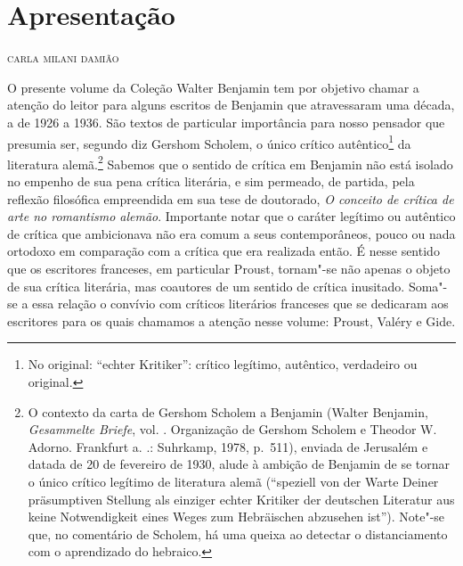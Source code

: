 \chapter*{Apresentação}

\begin{flushright}
{\bigskip\small\scshape\hfill {carla milani damião}}\smallskip
\end{flushright}

\noindent{}O presente volume da Coleção Walter Benjamin tem por objetivo chamar a
atenção do leitor para alguns escritos de Benjamin que atravessaram uma década, a de 1926 a 1936. São textos de particular importância para nosso pensador que
presumia ser, segundo diz Gershom Scholem, o único crítico autêntico\footnote{No original: ``echter Kritiker'': crítico legítimo, autêntico, verdadeiro ou original.} da
literatura alemã.\footnote{O contexto da carta de Gershom Scholem a
  Benjamin (Walter Benjamin, \emph{Gesammelte Briefe}, vol. . Organização de Gershom
  Scholem e Theodor W. Adorno. Frankfurt a. .: Suhrkamp, 1978, p.~511), enviada de Jerusalém e datada de 20 de fevereiro de 1930, alude à ambição de
  Benjamin de se tornar o único crítico legítimo de literatura alemã
  (``speziell von der Warte Deiner präsumptiven Stellung als einziger
      echter Kritiker der deutschen Literatur aus keine Notwendigkeit eines
      Weges zum Hebräischen abzusehen ist''). Note"-se que, no comentário de
  Scholem, há uma queixa ao detectar o distanciamento com o aprendizado
  do hebraico.} Sabemos que o sentido de crítica em Benjamin não está
isolado no empenho de sua pena crítica literária, e sim permeado, de
partida, pela reflexão filosófica empreendida em sua tese de doutorado,
\emph{O conceito de crítica de arte no romantismo alemão}. Importante
notar que o caráter legítimo ou autêntico de crítica que ambicionava não era comum a
seus contemporâneos, pouco ou nada ortodoxo em comparação com a crítica que
era realizada então. É nesse sentido que os escritores franceses, em particular Proust, tornam"-se não apenas o objeto de sua crítica literária, mas coautores de um sentido de crítica inusitado. Soma"-se a essa relação o convívio com críticos literários franceses que se dedicaram aos escritores para os quais chamamos a atenção nesse volume: Proust, Valéry e Gide.

